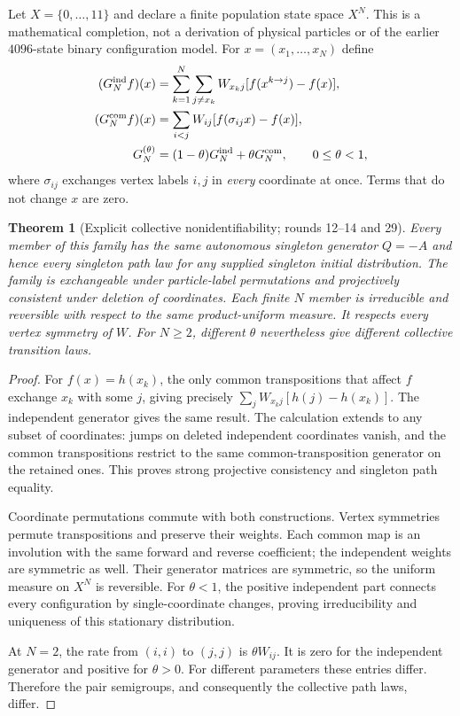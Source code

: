 \documentclass[11pt,a4paper]{article}
\newtheorem{theorem}{Theorem}
\begin{document}
Let $X=\{0,\ldots,11\}$ and declare a finite population state space $X^N$.
This is a mathematical completion, not a derivation of physical particles
or of the earlier $4096$-state binary configuration model. For
$x=(x_1,\ldots,x_N)$ define
\begin{align}
 (G_N^{\rm ind}f)(x)&=\sum_{k=1}^N\sum_{j\ne x_k}W_{x_kj}
       [f(x^{k\to j})-f(x)],\\
 (G_N^{\rm com}f)(x)&=\sum_{i<j}W_{ij}[f(\sigma_{ij}x)-f(x)],\\
 G_N^{(\theta)}&=(1-\theta)G_N^{\rm ind}+\theta G_N^{\rm com},
 \qquad 0\le\theta<1,
\end{align}
where $\sigma_{ij}$ exchanges vertex labels $i,j$ in \emph{every}
coordinate at once. Terms that do not change $x$ are zero.

\begin{theorem}[Explicit collective nonidentifiability; rounds 12--14 and 29]
Every member of this family has the same autonomous singleton generator
$Q=-A$ and hence every singleton path law for any supplied singleton
initial distribution. The family is exchangeable under particle-label
permutations and projectively consistent under deletion of coordinates.
Each finite $N$ member is irreducible and reversible with respect to the
same product-uniform measure. It respects every vertex symmetry of $W$.
For $N\ge2$, different $\theta$ nevertheless give different collective
transition laws.
\end{theorem}
\begin{proof}
For $f(x)=h(x_k)$, the only common transpositions that affect $f$ exchange
$x_k$ with some $j$, giving precisely
$\sum_jW_{x_kj}[h(j)-h(x_k)]$. The independent generator gives the same
result. The calculation extends to any subset of coordinates: jumps on
deleted independent coordinates vanish, and the common transpositions
restrict to the same common-transposition generator on the retained ones.
This proves strong projective consistency and singleton path equality.

Coordinate permutations commute with both constructions. Vertex symmetries
permute transpositions and preserve their weights. Each common map is an
involution with the same forward and reverse coefficient; the independent
weights are symmetric as well. Their generator matrices are symmetric, so
the uniform measure on $X^N$ is reversible. For $\theta<1$, the positive
independent part connects every configuration by single-coordinate changes,
proving irreducibility and uniqueness of this stationary distribution.

At $N=2$, the rate from $(i,i)$ to $(j,j)$ is $\theta W_{ij}$.
It is zero for the independent generator and positive for $\theta>0$.
For different parameters these entries differ. Therefore the pair
semigroups, and consequently the collective path laws, differ.
\end{proof}
\end{document}
